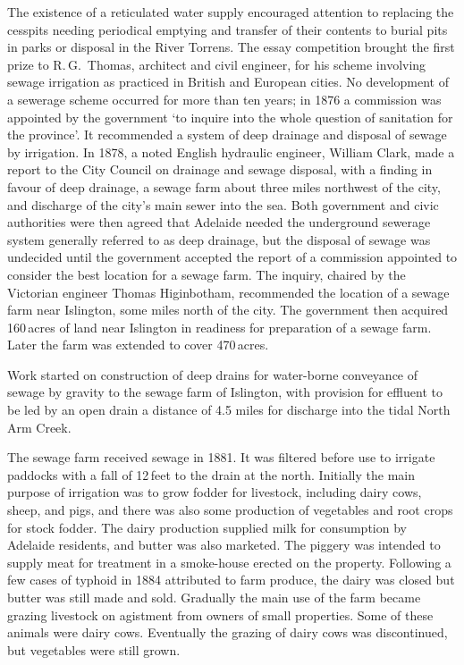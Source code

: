 The existence of a reticulated water supply encouraged attention to
replacing the cesspits needing periodical emptying and transfer of
their contents to burial pits in parks or disposal in the River
Torrens.   The essay competition brought the
first prize to R.\,G.~Thomas,   architect and
civil engineer, for his scheme involving sewage irrigation as
practiced in British and European cities.  No development of a
sewerage scheme occurred for more than ten years; in 1876 a commission
was appointed by the government `to inquire into the whole question of
sanitation for the province'.  It recommended a system of deep
drainage and disposal of sewage by irrigation.  In 1878, a noted
English hydraulic engineer, William Clark,   made a
report to the City Council on drainage and sewage disposal, with a
finding in favour of deep drainage, a sewage farm about three miles
northwest of the city, and discharge of the city's main sewer into the
sea.  Both government and civic authorities were then agreed that
Adelaide needed the underground sewerage system generally referred to
as deep drainage, but the disposal of sewage was undecided until the
government accepted the report of a commission appointed to consider
the best location for a sewage farm.  The inquiry, chaired by the
Victorian engineer Thomas Higinbotham, 
recommended the location of a sewage farm near Islington, some miles
north of the city.  The government then acquired 160\,acres of land
near Islington in readiness for preparation of a sewage farm. Later
the farm was extended to cover 470\,acres.

Work started on construction of deep drains for water-borne conveyance
of sewage by gravity to the sewage farm of Islington,  with provision for effluent to be led by an open
drain a distance of 4.5 miles for discharge into the tidal North Arm
Creek. 

The sewage farm received sewage in 1881.  It was filtered before use
to irrigate paddocks with a fall of 12\,feet to the drain at the
north.  Initially the main purpose of irrigation was to grow fodder
for livestock, including dairy cows, sheep, and pigs, and there was
also some production of vegetables and root crops for stock fodder.
The dairy production supplied milk for consumption by Adelaide
residents, and butter was also marketed.  The piggery was intended to
supply meat for treatment in a smoke-house erected on the property.
Following a few cases of typhoid in 1884 attributed to farm produce,
the dairy was closed but butter was still made and sold.  Gradually
the main use of the farm became grazing livestock on agistment from
owners of small properties.  Some of these animals were dairy cows.
Eventually the grazing of dairy cows was discontinued, but vegetables
were still grown.

